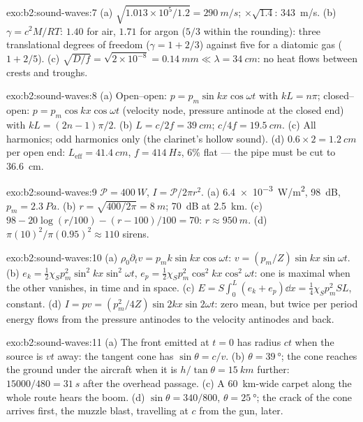 \begin{solution}{exo:b2:sound-waves:7}
(a) $\sqrt{1.013 \times 10^5/1.2} = \qty{290}{m/s}$; $\times\sqrt{1.4}$: \qty{343}{m/s}. (b)
$\gamma = c^2M/RT$: $1.40$ for air, $1.71$ for argon ($5/3$ within the rounding):
three translational degrees of freedom ($\gamma = 1 + 2/3$) against five for
a diatomic gas ($1 + 2/5$). (c) $\sqrt{D/f} = \sqrt{2 \times 10^{-8}} = \qty{0.14}{mm}
\ll \lambda = \qty{34}{cm}$: no heat flows between crests and troughs.
\end{solution}

\begin{solution}{exo:b2:sound-waves:8}
(a) Open--open: $p = p_m\sin kx\cos\omega t$ with $kL = n\pi$; closed--open:
$p = p_m\cos kx\cos\omega t$ (velocity node, pressure antinode at the closed
end) with $kL = (2n - 1)\pi/2$. (b) $L = c/2f = \qty{39}{cm}$; $c/4f = \qty{19.5}{cm}$.
(c) All harmonics; odd harmonics only (the clarinet's hollow sound).
(d) $0.6 \times 2 = \qty{1.2}{cm}$ per open end: $L_{\text{eff}} = \qty{41.4}{cm}$, $f =
\qty{414}{Hz}$, $6\%$ flat --- the pipe must be cut to \qty{36.6}{cm}.
\end{solution}

\begin{solution}{exo:b2:sound-waves:9}
$\mathcal P = \qty{400}{W}$, $I = \mathcal P/2\pi r^2$. (a) \qty{6.4e-3}{W/m^2}, \qty{98}{dB},
$p_m = \qty{2.3}{Pa}$. (b) $r = \sqrt{400/2\pi} = \qty{8}{m}$; \qty{70}{dB} at \qty{2.5}{km}.
(c) $98 - 20\log(r/100) - (r - 100)/100 = 70$: $r \approx \qty{950}{m}$. (d)
$\pi(10)^2/\pi(0.95)^2 \approx 110$ sirens.
\end{solution}

\begin{solution}{exo:b2:sound-waves:10}
(a) $\rho_0\partial_tv = p_mk\sin kx\cos\omega t$: $v = (p_m/Z)\sin kx\sin\omega t$. (b)
$e_k = \tfrac12\chi_Sp_m^2\sin^2kx\sin^2\omega t$, $e_p = \tfrac12\chi_Sp_m^2\cos^2kx\cos^2\omega t$:
one is maximal when the other vanishes, in time and in space. (c) $E =
S\int_0^L(e_k + e_p)\dd x = \tfrac14\chi_Sp_m^2SL$, constant. (d) $I = pv =
(p_m^2/4Z)\sin2kx\sin2\omega t$: zero mean, but twice per period energy
flows from the pressure antinodes to the velocity antinodes and back.
\end{solution}

\begin{solution}{exo:b2:sound-waves:11}
(a) The front emitted at $t = 0$ has radius $ct$ when the source is $vt$
away: the tangent cone has $\sin\theta = c/v$. (b) $\theta = \qty{39}{\degree}$; the cone
reaches the ground under the aircraft when it is $h/\tan\theta = \qty{15}{km}$
further: $15000/480 = \qty{31}{s}$ after the overhead passage. (c) A
\qty{60}{km}-wide carpet along the whole route hears the boom. (d) $\sin\theta
= 340/800$, $\theta = \qty{25}{\degree}$; the crack of the cone arrives first, the
muzzle blast, travelling at $c$ from the gun, later.
\end{solution}


